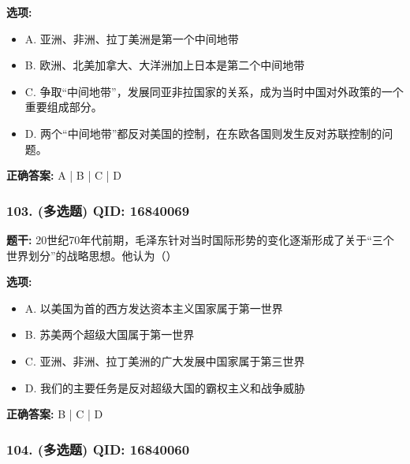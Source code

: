 \documentclass[12pt,UTF8]{ctexart}
\begin{document}
\textbf{选项:}
\begin{itemize}[leftmargin=*]

  \item A. 亚洲、非洲、拉丁美洲是第一个中间地带

  \item B. 欧洲、北美加拿大、大洋洲加上日本是第二个中间地带

  \item C. 争取“中间地带”，发展同亚非拉国家的关系，成为当时中国对外政策的一个重要组成部分。

  \item D. 两个“中间地带”都反对美国的控制，在东欧各国则发生反对苏联控制的问题。

\end{itemize}

\textbf{正确答案:}
A | B | C | D

\vspace{0.3em}\hrulefill\vspace{0.7em}

\subsubsection*{103. (多选题) \small QID: 16840069}

\textbf{题干:}
20世纪70年代前期，毛泽东针对当时国际形势的变化逐渐形成了关于“三个世界划分”的战略思想。他认为（）

\textbf{选项:}
\begin{itemize}[leftmargin=*]

  \item A. 以美国为首的西方发达资本主义国家属于第一世界

  \item B. 苏美两个超级大国属于第一世界

  \item C. 亚洲、非洲、拉丁美洲的广大发展中国家属于第三世界

  \item D. 我们的主要任务是反对超级大国的霸权主义和战争威胁

\end{itemize}

\textbf{正确答案:}
B | C | D

\vspace{0.3em}\hrulefill\vspace{0.7em}

\subsubsection*{104. (多选题) \small QID: 16840060}
\end{document}
